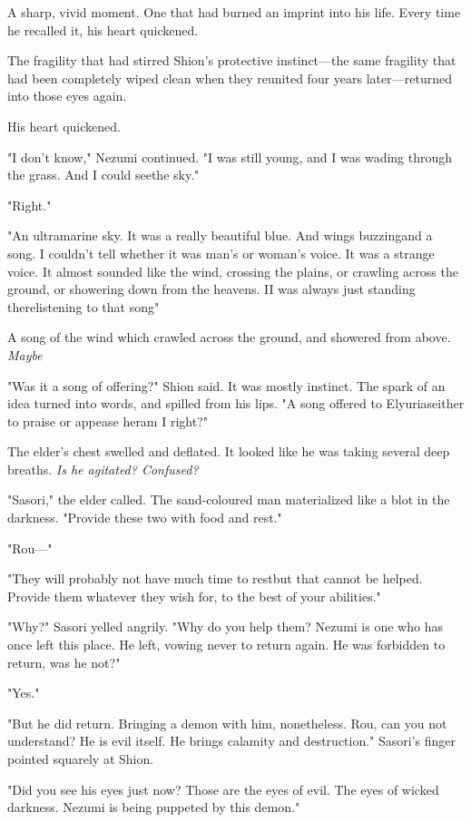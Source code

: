 A sharp, vivid moment. One that had burned an imprint into his life.
Every time he recalled it, his heart quickened.

The fragility that had stirred Shion's protective instinct---the same
fragility that had been completely wiped clean when they reunited four
years later---returned into those eyes again.

His heart quickened.

"I don't know," Nezumi continued. "I was still young, and I was wading
through the grass. And I could see\el the sky."

"Right."

"An ultramarine sky. It was a really beautiful blue. And wings
buzzing\el and a song. I couldn't tell whether it was man's or woman's
voice. It was a strange voice. It almost sounded like the wind, crossing
the plains, or crawling across the ground, or showering down from the
heavens. I\el I was always just standing there\el listening to that
song\el "

A song of the wind which crawled across the ground, and showered from
above. \emph{Maybe\el }

"Was it a song of offering?" Shion said. It was mostly instinct. The
spark of an idea turned into words, and spilled from his lips. "A song
offered to Elyurias\el either to praise or appease her\el am I right?"

The elder's chest swelled and deflated. It looked like he was taking
several deep breaths. \emph{Is he agitated? Confused?}

"Sasori," the elder called. The sand-coloured man materialized like a
blot in the darkness. "Provide these two with food and rest."

"Rou---"

"They will probably not have much time to rest\el but that cannot be
helped. Provide them whatever they wish for, to the best of your
abilities."

"Why?" Sasori yelled angrily. "Why do you help them? Nezumi is one who
has once left this place. He left, vowing never to return again. He was
forbidden to return, was he not?"

"Yes."

"But he did return. Bringing a demon with him, nonetheless. Rou, can you
not understand? He is evil itself. He brings calamity and destruction."
Sasori's finger pointed squarely at Shion.

"Did you see his eyes just now? Those are the eyes of evil. The eyes of
wicked darkness. Nezumi is being puppeted by this demon."

